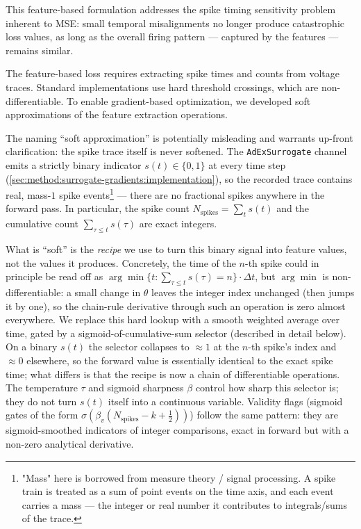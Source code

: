 This feature-based formulation addresses the spike timing sensitivity problem inherent to MSE:
small temporal misalignments no longer produce catastrophic loss values,
as long as the overall firing pattern --- captured by the features --- remains similar.

The feature-based loss requires extracting spike times and counts from voltage traces.
Standard implementations use hard threshold crossings, which are non-differentiable.
To enable gradient-based optimization, we developed soft approximations of the feature extraction operations.

The naming ``soft approximation'' is potentially misleading and warrants up-front clarification: the spike trace itself is never softened.
The \texttt{AdExSurrogate} channel emits a strictly binary indicator $s(t)\in\{0,1\}$ at every time step (\cref{sec:method:surrogate-gradients:implementation}),
so the recorded trace contains real, mass-$1$ spike events\footnote{
"Mass" here is borrowed from measure theory / signal processing.
A spike train is treated as a sum of point events on the time axis, and each event carries a mass --- the integer or real number it contributes to integrals/sums of the trace.}
--- there are no fractional spikes anywhere in the forward pass.
In particular, the spike count $N_{\text{spikes}} = \sum_{t} s(t)$ and the cumulative count $\sum_{\tau\leq t} s(\tau)$ are exact integers.

What is ``soft'' is the \emph{recipe} we use to turn this binary signal into feature values, not the values it produces.
Concretely, the time of the $n$-th spike could in principle be read off as $\arg\min\{t : \sum_{\tau\leq t} s(\tau) = n\}\cdot\Delta t$,
but $\arg\min$ is non-differentiable: a small change in $\theta$ leaves the integer index unchanged (then jumps it by one),
so the chain-rule derivative through such an operation is zero almost everywhere.
We replace this hard lookup with a smooth weighted average over time, gated by a sigmoid-of-cumulative-sum selector (described in detail below).
On a binary $s(t)$ the selector collapses to $\approx\!1$ at the $n$-th spike's index and $\approx\!0$ elsewhere,
so the forward value is essentially identical to the exact spike time; what differs is that the recipe is now a chain of differentiable operations.
The temperature $\tau$ and sigmoid sharpness $\beta$ control how sharp this selector is; they do not turn $s(t)$ itself into a continuous variable.
Validity flags (sigmoid gates of the form $\sigma(\beta_v(N_{\text{spikes}}-k+\tfrac{1}{2}))$) follow the same pattern:
they are sigmoid-smoothed indicators of integer comparisons, exact in forward but with a non-zero analytical derivative.

